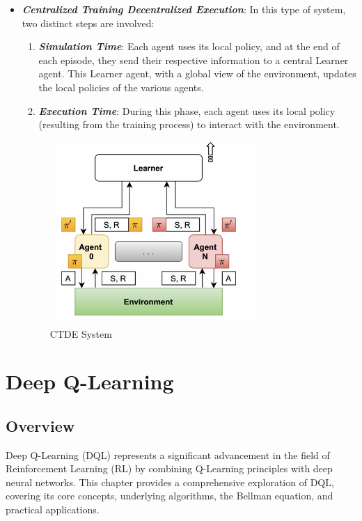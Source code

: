 \documentclass{scrartcl}
\begin{document}
\begin{itemize}
    \item \textbf{\textit{Centralized Training Decentralized Execution}}: In this type of system, two distinct steps are involved:
    \begin{enumerate}
        \item \textbf{\textit{Simulation Time}}: Each agent uses its local policy, and at the end of each episode, they send their respective information to a central Learner agent. This Learner agent, with a global view of the environment, updates the local policies of the various agents.
        \item \textbf{\textit{Execution Time}}: During this phase, each agent uses its local policy (resulting from the training process) to interact with the environment.
    \end{enumerate}
    
    \begin{figure}
    \centering
    \includegraphics[width=8cm]{img/CTDE.png}
    \caption{CTDE System \cite{aguzzi}}
    \end{figure}
    
\end{itemize}


\newpage

\section{Deep Q-Learning}

\subsection{Overview}

Deep Q-Learning (DQL) represents a significant advancement in the field of Reinforcement Learning (RL) by combining Q-Learning principles with deep neural networks. This chapter provides a comprehensive exploration of DQL, covering its core concepts, underlying algorithms, the Bellman equation, and practical applications.
\end{document}
